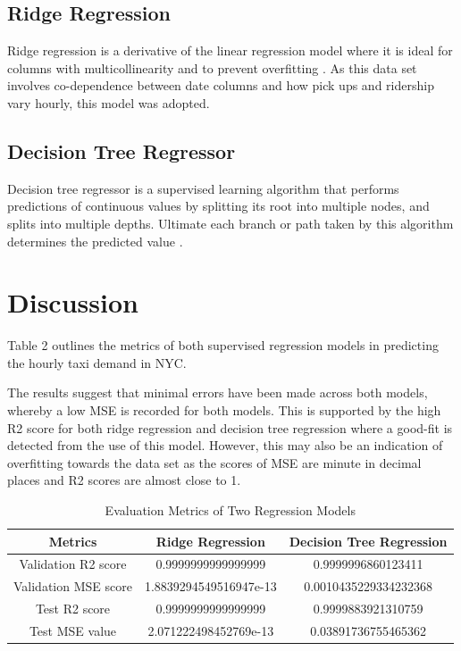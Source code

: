 \documentclass[11pt]{article}
\begin{document}
\subsection{Ridge Regression}
Ridge regression is a derivative of the linear regression model where it is ideal for columns with multicollinearity and to prevent overfitting \cite{RidgeReg}. As this data set involves co-dependence between date columns and how pick ups and ridership vary hourly, this model was adopted. 
\subsection{Decision Tree Regressor}
Decision tree regressor is a supervised learning algorithm that performs predictions of continuous values by splitting its root into multiple nodes, and splits into multiple depths. Ultimate each branch or path taken by this algorithm determines the predicted value \cite{DTReg}.
\section{Discussion}
Table 2 outlines the metrics of both supervised regression models in predicting the hourly taxi demand in NYC.

The results suggest that minimal errors have been made across both models, whereby a low MSE is recorded for both models. This is supported by the high R2 score for both ridge regression and decision tree regression where a good-fit is detected from the use of this model. However, this may also be an indication of overfitting towards the data set as the scores of MSE are minute in decimal places and R2 scores are almost close to 1. 

\begin{center}
\begin{table}[h]
    \centering
    \begin{tabular}{||c|c|c||}
        \hline \textbf{Metrics} & \textbf{Ridge Regression} & \textbf{Decision Tree Regression}\\
        \hline
         Validation R2 score & 0.9999999999999999 & 0.9999996860123411\\
         Validation MSE score & 1.8839294549516947e-13 & 0.0010435229334232368\\
         Test R2 score &  0.9999999999999999 & 0.9999883921310759 \\
         Test MSE value & 2.071222498452769e-13 & 0.03891736755465362 \\
        \hline
    \end{tabular}
    \caption{Evaluation Metrics of Two Regression Models}
    \label{table:1}
\end{table}
    
\end{center}
\end{document}

